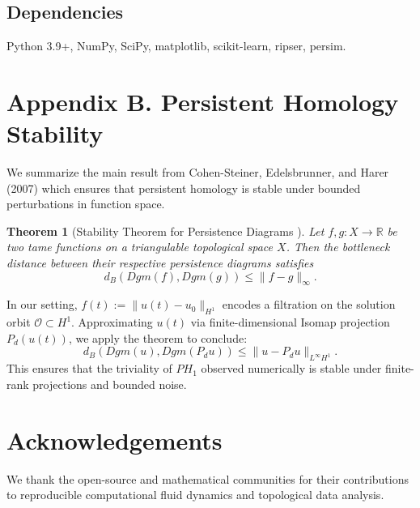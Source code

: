 \documentclass[11pt]{article}
\newtheorem{theorem}{Theorem}[section]
\theoremstyle{definition}
\begin{document}
\subsection*{Dependencies}
Python 3.9+, NumPy, SciPy, matplotlib, scikit-learn, ripser, persim.

\section{Appendix B. Persistent Homology Stability}
\label{sec:appendixB}

We summarize the main result from Cohen-Steiner, Edelsbrunner, and Harer (2007) which ensures that persistent homology is stable under bounded perturbations in function space.

\begin{theorem}[Stability Theorem for Persistence Diagrams \cite{CohenSteiner2007}]
Let $f, g : X \to \mathbb{R}$ be two tame functions on a triangulable topological space $X$. Then the bottleneck distance between their respective persistence diagrams satisfies
\[
d_B(Dgm(f), Dgm(g)) \le \|f - g\|_\infty.
\]
\end{theorem}

\noindent In our setting, $f(t) := \|u(t) - u_0\|_{H^1}$ encodes a filtration on the solution orbit $\mathcal O \subset H^1$. Approximating $u(t)$ via finite-dimensional Isomap projection $P_d(u(t))$, we apply the theorem to conclude:
\[
d_B(Dgm(u), Dgm(P_d u)) \le \|u - P_d u\|_{L^\infty H^1}.
\]
This ensures that the triviality of $PH_1$ observed numerically is stable under finite-rank projections and bounded noise.

\section*{Acknowledgements}
We thank the open-source and mathematical communities for their contributions to reproducible computational fluid dynamics and topological data analysis.
\end{document}
